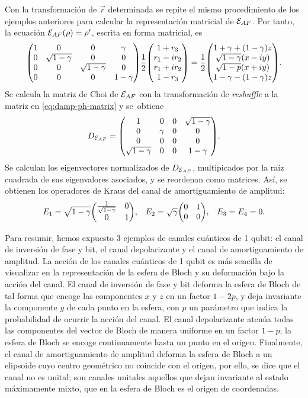 Con la transformación de $\vec{r}$ determinada se repite 
el mismo procedimiento de los ejemplos anteriores 
para calcular la representación matricial de $\mathcal{E}_{AF}$. 
Por tanto, la ecuación $\mathcal{E}_{AF}(\rho)=\rho'$, escrita 
en forma matricial, es 
\begin{align}
\mqty(
 1 & 0 & 0 & \gamma  \\
 0 & \sqrt{1-\gamma } & 0 & 0 \\
 0 & 0 & \sqrt{1-\gamma } & 0 \\
 0 & 0 & 0 & 1-\gamma  
)
\frac{1}{2}
\mqty(
1+r_3\\r_1-ir_2\\r_1+ir_2\\1-r_3
)
=
\frac{1}{2}
\mqty(
1+\gamma+\qty(1-\gamma)z\\
\sqrt{1-\gamma}\qty(x-i y)\\
\sqrt{1-p}\qty(x+i y)\\
1-\gamma-\qty(1-\gamma)z
).
\label{eq:damp-ph-matrix}
\end{align}
Se calcula la matriz de Choi de $\mathcal{E}_{AF}$ con la transformación
de \textit{reshuffle} a la matriz en \eqref{eq:damp-ph-matrix}
y se~obtiene
\begin{align}
D_{\E_{AF}}=
\mqty(
 1 & 0 & 0 & \sqrt{1-\gamma } \\
 0 & \gamma  & 0 & 0 \\
 0 & 0 & 0 & 0 \\
 \sqrt{1-\gamma } & 0 & 0 & 1-\gamma  
).
\end{align}
Se calculan los eigenvectores normalizados de $D_{\mathcal{E}_{AF}}$, multipicados
por la raíz cuadrada de sus eigenvalores asociados, y se reordenan
como matrices. Así, se obtienen los operadores de Kraus 
del canal de amortiguamiento de amplitud:
\begin{align}
E_1&=
\sqrt{1-\gamma }
\mqty(
\frac{1}{\sqrt{1-\gamma }} & 0 \\
0 & 1
),&
E_2&=
\sqrt{\gamma }
\mqty(
0 & 1 \\
0 & 0 
),
&
E_3=E_4=0.
\end{align}

Para resumir, hemos expuesto 3 ejemplos de canales cuánticos de 1 qubit:
el canal de inversión de fase y bit, el canal depolarizante 
y el canal de amortiguamiento
de amplitud. La acción de los canales cuánticos de 1 qubit 
es más sencilla de visualizar en la representación de la esfera de Bloch
y su deformación bajo la acción del canal. 
El canal de inversión de fase y bit deforma la
esfera de Bloch de tal forma que encoge las componentes $x$ y $z$ en 
un factor $1-2p$, y deja invariante la componente
$y$ de cada punto en la esfera, con $p$ un parámetro que indica la
probabilidad de ocurrir la acción del canal. 
El canal depolarizante 
atenúa todas las componentes del vector de Bloch de manera uniforme
en un factor $1-p$; la esfera de Bloch se encoge
continuamente hasta un punto en el origen. Finalmente, 
el canal de amortiguamiento de amplitud deforma la esfera de Bloch
a un elipsoide cuyo centro geométrico no coincide con el origen, por
ello, se dice que el canal no es unital; son canales unitales aquellos 
que dejan invariante al estado máximamente mixto, 
que en la esfera de Bloch es el origen de coordenadas.


